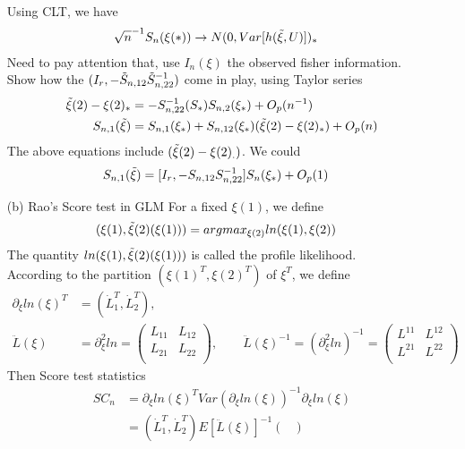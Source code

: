 \begin{itemize}
Using CLT, we have 
\begin{align*}
\sqrt{n}^{-1} S_n(\xi(\ast))  & \rightarrow N(0, Var[h(\Tilde{\xi}, U)])_{\ast} 
\end{align*} 
Need to pay attention that, use $I_n(\xi)$ the observed fisher information.\\
Show how the $(I_r, -\Tilde{S}_{n,12}\Tilde{S}^{-1}_{n,22})$ come in play, using Taylor series
\begin{align*}
\Tilde{\xi}(2) - \xi(2)_{\ast} &= - S_{n,22}^{-1}(S_{\ast}) S_{n,2}(\xi_{\ast}) + O_p(n^{-1})\\
 S_{n,1}(\Tilde{\xi}) &= S_{n,1}(\xi_{\ast}) + S_{n,12}(\xi_{\ast}) (\Tilde{\xi}(2) -\xi(2)_{\ast}) + O_p(n) 
\end{align*} 
The above equations include $(\Tilde{\xi}(2) -\xi(2)_{.})$. We could 
\begin{align*}
 S_{n,1}(\Tilde{\xi}) &= [I_r, - S_{n,12} S_{n,22}^{-1}] S_{n}(\xi_{\ast}) + O_p(1)
\end{align*} 
\item[(b)] Rao's Score test in GLM
For a fixed $\xi(1)$, we define 
\begin{align*}
 (\xi(1), \Tilde{\xi}(2)(\xi(1))) &= argmax_{\xi{(2)}} ln(\xi{(1)}, \xi(2))
\end{align*} 
The quantity $ln(\xi{(1)},  \Tilde{\xi}(2)(\xi(1)))$ is called the profile likelihood. \\
According to the partition $(\xi{(1)}^T, \xi(2)^T)$ of $\xi^T$, we define
\begin{align*}
 \partial_{\xi}ln(\xi)^T &= (\dot{L}_1^T, \dot{L}_2^T),\\
 \ddot{L}(\xi) &= \partial_{\xi}^2 ln = \begin{pmatrix}
            L_{11} & L_{12}\\
           L_{21} & L_{22}\\
         \end{pmatrix} , \qquad \ddot{L}(\xi)^{-1} = (\partial_{\xi}^2 ln)^{-1} =\begin{pmatrix}
            L^{11} & L^{12}\\
           L^{21} & L^{22}\\
         \end{pmatrix} 
\end{align*} 
Then Score test statistics
\begin{align*}
 SC_n &= \partial_{\xi}ln(\xi)^T Var \left(\partial_{\xi}ln(\xi) \right)^{-1} \partial_{\xi}ln(\xi)\\
 &= (\dot{L}_1^T, \dot{L}_2^T) E \left[ \ddot{L}(\xi)\right]^{-1}  \begin{pmatrix}

\end{pmatrix}
\end{align*}
\end{itemize}
